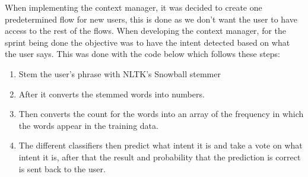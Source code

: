 When implementing the context manager, it was decided to create one predetermined flow for new users, this is done as we don’t want the user to have access to the rest of the flows. When developing the context manager, for the sprint being done the objective was to have the intent detected based on what the user says. This was done with the code below which follows these steps:

\begin{enumerate}
	\item {Stem the user’s phrase with NLTK’s Snowball stemmer}
	\item {After it converts the stemmed words into numbers.}
	\item {Then converts the count for the words into an array of the frequency in which the words appear in the training data.}
	\item {The different classifiers then predict what intent it is and take a vote on what intent it is, after that the result and probability that the prediction is correct is sent back to the user.}
\end{enumerate}

